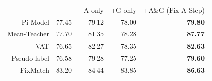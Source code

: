 \begin{tabular}{r | r | r | r | r}
             & ~~~~ & +A only & +G only & +A\&G (Fix-A-Step)
\\ 
    Pi-Model & 77.45 & 79.12 & 78.00 & \textbf{79.80} 
\\ 
    Mean-Teacher & 77.70 & 81.35 & 78.28 & \textbf{87.77}
\\ 
    VAT & 76.65 & 82.27 & 78.35 & \textbf{82.63}
\\
    Pseudo-label & 76.58 & 79.28 & 77.25 & \textbf{79.60}
\\
    FixMatch & 83.20 & 84.44 & 83.85 & \textbf{86.63}
\end{tabular}